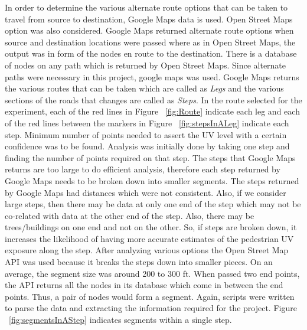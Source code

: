 \documentclass[10pt]{sigplan-proc-varsize}
\begin{document}
In order to determine the various alternate route options that can be taken to travel from source to destination, Google Maps \cite{googleMapsOriginal} data is used. Open Street Maps option was also considered. Google Maps returned alternate route options when source and destination locations were passed where as in Open Street Maps, the output was in form of the nodes en route to the destination. There is a database of nodes on any path which is returned by Open Street Maps. Since alternate paths were necessary in this project, google maps was used. Google Maps returns the various routes that can be taken which are called as {\it Legs} and the various sections of the roads that changes are called as {\it Steps}. In the route selected for the experiment, each of the red lines in Figure ~\ref{fig:Route} indicate each leg and each of the red lines between the markers in Figure ~\ref{fig:stepsInALeg} indicate each step. Minimum number of points needed to assert the UV level with a certain confidence was to be found. Analysis was initially done by taking one step and finding the number of points required on that step. The steps that Google Maps returns are too large to do efficient analysis, therefore each step returned by Google Maps needs to be broken down into smaller segments. The steps returned by Google Maps had distances which were not consistent. Also, if we consider large steps, then there may be data at only one end of the step which may not be co-related with data at the other end of the step. Also, there may be trees/buildings on one end and not on the other. So, if steps are broken down, it increases the likelihood of having more accurate estimates of the pedestrian UV exposure along the step. After analyzing various options the Open Street Map API  \cite{openStreetMapsDirections} was used because it breaks the steps down into smaller pieces. On an average, the segment size was around 200 to 300 ft. When passed two end points, the API returns all the nodes in its database which come in between the end points. Thus, a pair of nodes would form a segment. Again, scripts were written to parse the data and extracting the information required for the project. Figure ~\ref{fig:segmentsInAStep} indicates segments within a single step.
\end{document}

